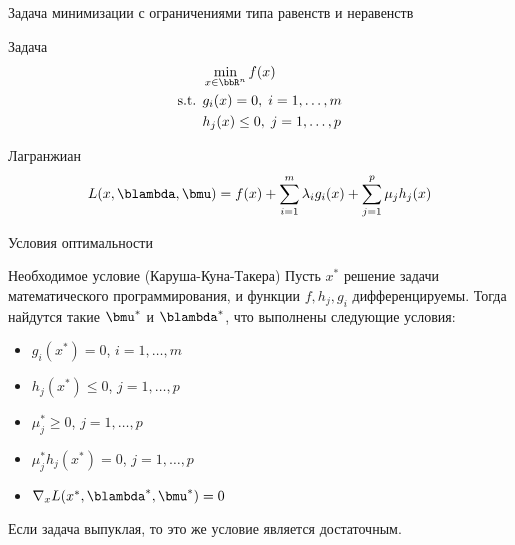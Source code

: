 \documentclass[12pt]{beamer}
\begin{document}
\begin{frame}{{\small Задача минимизации с ограничениями типа равенств и неравенств}}

\begin{block}{Задача}
\vspace{-5mm}
\begin{equation*}
\begin{split}
& \min\limits_{x \in \bbR^n} f(x)\\
\text{s.t. } & g_i(x) = 0, \; i = 1,\ldots,m\\
& h_j(x) \leq 0, \; j = 1,\ldots, p
\end{split}
\end{equation*}
\end{block}

\begin{block}{Лагранжиан}
\begin{equation*}
L(x, \blambda, \bmu) = f(x) + \sum\limits_{i=1}^m\lambda_i g_i(x) + \sum\limits_{j=1}^p \mu_j h_j(x)
\end{equation*}
\end{block}
\end{frame}

\begin{frame}{Условия оптимальности}
\begin{block}{Необходимое условие (Каруша-Куна-Такера)}
Пусть $x^*$ решение задачи математического программирования, и функции $f, h_j, g_i$ дифференцируемы. 
Тогда найдутся такие $\bmu^*$ и $\blambda^*$, что выполнены следующие условия:
\begin{itemize}
\item $g_i(x^*) = 0$, $i = 1,\ldots,m$
\item $h_j(x^*) \leq 0$, $j = 1,\ldots,p$
\item $ \mu^*_j \geq 0$, $j = 1,\ldots,p$
\item $\mu^*_jh_j(x^*) = 0$, $j = 1,\ldots,p$
\item $\nabla_x L(x^*, \blambda^*, \bmu^*) = 0$
\end{itemize}
\end{block}
Если задача выпуклая, то это же условие является достаточным.
\end{frame}
\end{document}
